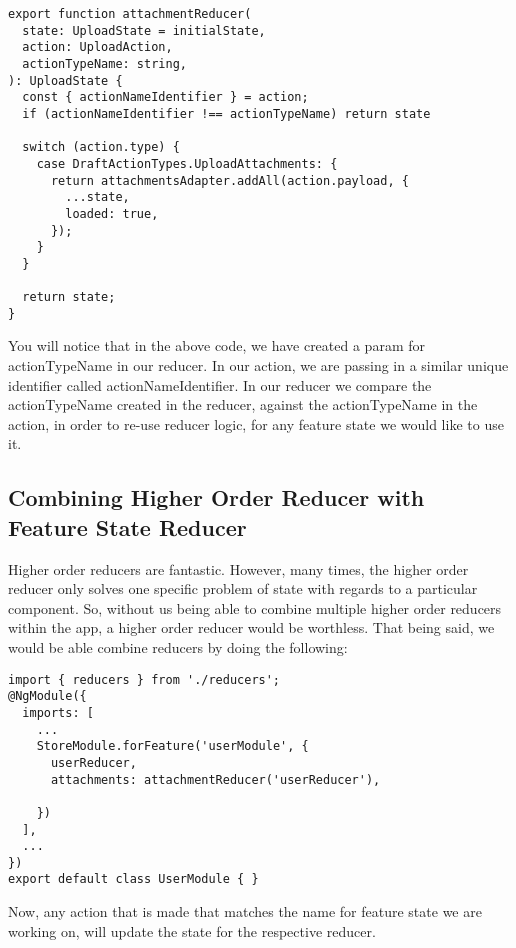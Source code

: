 \begin{lstlisting}
export function attachmentReducer(
  state: UploadState = initialState,
  action: UploadAction,
  actionTypeName: string,
): UploadState {
  const { actionNameIdentifier } = action;
  if (actionNameIdentifier !== actionTypeName) return state

  switch (action.type) {
    case DraftActionTypes.UploadAttachments: {
      return attachmentsAdapter.addAll(action.payload, {
        ...state,
        loaded: true,
      });
    }
  }

  return state;
}
\end{lstlisting}

You will notice that in the above code, we have created a param for
actionTypeName in our reducer. In our action, we are passing in a similar unique
identifier called actionNameIdentifier. In our reducer we compare the
actionTypeName created in the reducer, against the actionTypeName in the action,
in order to re-use reducer logic, for any feature state we would like to use it.

\subsection{Combining Higher Order Reducer with Feature State Reducer }

Higher order reducers are fantastic. However, many times, the higher order
reducer only solves one specific problem of state with regards to a particular
component. So, without us being able to combine multiple higher order reducers
within the app, a higher order reducer would be worthless. That being said, we
would be able combine reducers by doing the following:

\begin{lstlisting}
import { reducers } from './reducers';
@NgModule({
  imports: [
    ...
    StoreModule.forFeature('userModule', {
      userReducer,
      attachments: attachmentReducer('userReducer'),

    })
  ],
  ...
})
export default class UserModule { }
\end{lstlisting}

Now, any action that is made that matches the name for feature state we are
working on, will update the state for the respective reducer.

